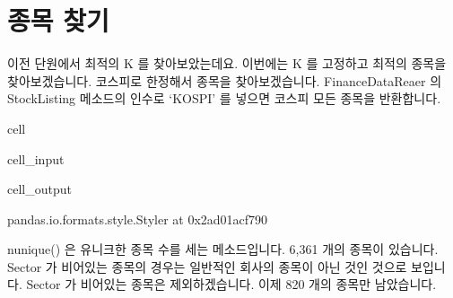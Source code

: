 \documentclass[letterpaper,10pt,english]{jupyterBook}
\begin{document}
\chapter{종목 찾기}
\label{\detokenize{chapter2/2.4.1_Volatility_Breakout:id3}}
\sphinxAtStartPar
이전 단원에서 최적의 K 를 찾아보았는데요. 이번에는 K 를 고정하고 최적의 종목을 찾아보겠습니다. 코스피로 한정해서 종목을 찾아보겠습니다. FinanceDataReaer 의 StockListing 메소드의 인수로 ‘KOSPI’ 를 넣으면 코스피 모든 종목을 반환합니다.

\begin{sphinxuseclass}{cell}\begin{sphinxVerbatimInput}

\begin{sphinxuseclass}{cell_input}
\begin{sphinxVerbatim}[commandchars=\\\{\}]
    
   
   

  
\end{sphinxVerbatim}

\end{sphinxuseclass}\end{sphinxVerbatimInput}
\begin{sphinxVerbatimOutput}

\begin{sphinxuseclass}{cell_output}
\begin{sphinxVerbatim}[commandchars=\\\{\}]
\PYGZlt{}pandas.io.formats.style.Styler at 0x2ad01acf790\PYGZgt{}
\end{sphinxVerbatim}

\end{sphinxuseclass}\end{sphinxVerbatimOutput}

\end{sphinxuseclass}
\sphinxAtStartPar
 nunique() 은 유니크한 종목 수를 세는 메소드입니다. 6,361 개의 종목이 있습니다. Sector 가 비어있는 종목의 경우는 일반적인 회사의 종목이 아닌 것인 것으로 보입니다. Sector 가 비어있는 종목은 제외하겠습니다. 이제 820 개의 종목만 남았습니다.
\end{document}
